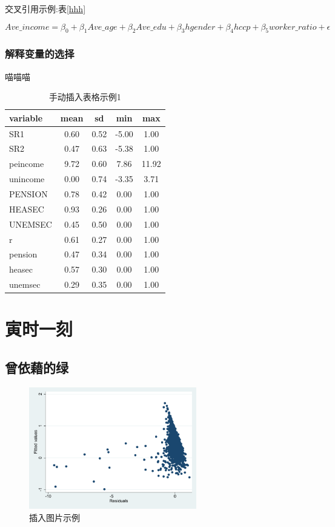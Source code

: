 \documentclass[a4paper,12pt]{report}
\begin{document}
交叉引用示例:表\ref{hhh}

\[
Ave\_income = \beta_0 + \beta_{1}Ave\_age + \beta_{2}Ave\_edu + \beta_{3}hgender + \beta_{4}hccp + \beta_{5}worker\_ratio + \epsilon
\]


\subsection{解释变量的选择}
喵喵喵
\begin{table}
    \caption{手动插入表格示例1}
    \centering
    \begin{tabular}{lcccc}
        \toprule[1.5pt]
        variable & mean & sd & min & max \\ 
        \midrule[1.0pt]
        SR1 & 0.60 & 0.52 & -5.00 & 1.00 \\ 
        SR2 & 0.47 & 0.63 & -5.38 & 1.00 \\ 
        peincome & 9.72 & 0.60 & 7.86 & 11.92 \\ 
        unincome & 0.00 & 0.74 & -3.35 & 3.71 \\ 
        PENSION & 0.78 & 0.42 & 0.00 & 1.00 \\ 
        HEASEC & 0.93 & 0.26 & 0.00 & 1.00 \\ 
        UNEMSEC & 0.45 & 0.50 & 0.00 & 1.00 \\ 
        r & 0.61 & 0.27 & 0.00 & 1.00 \\ 
        pension & 0.47 & 0.34 & 0.00 & 1.00 \\ 
        heasec & 0.57 & 0.30 & 0.00 & 1.00 \\ 
        unemsec & 0.29 & 0.35 & 0.00 & 1.00 \\ 
        \bottomrule[1.5pt]
    \end{tabular}
\end{table}




\chapter{寅时一刻}
\section{曾依藉的绿}
\begin{figure}[H]
    \centering
    \includegraphics[width=0.65\textwidth]{figure/cancha.pdf}
    \caption{插入图片示例}
\end{figure}
\end{document}
